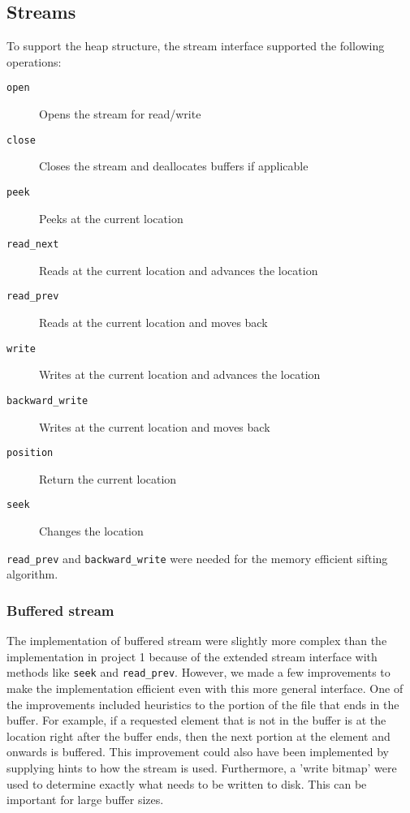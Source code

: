 \subsection{Streams}

To support the heap structure, the stream interface supported the following operations:

\begin{description}
\item[{\texttt{open}}] Opens the stream for read/write
\item[{\texttt{close}}] Closes the stream and deallocates buffers if applicable
\item[{\texttt{peek}}] Peeks at the current location
\item[{\texttt{read\_next}}] Reads at the current location and advances the location
\item[{\texttt{read\_prev}}] Reads at the current location and moves back
\item[{\texttt{write}}] Writes at the current location and advances the location
\item[{\texttt{backward\_write}}] Writes at the current location and moves back
\item[{\texttt{position}}] Return the current location
\item[{\texttt{seek}}] Changes the location
\end{description}

\texttt{read\_prev} and \texttt{backward\_write} were needed for the memory efficient sifting algorithm.

\subsubsection{Buffered stream}

The implementation of buffered stream were slightly more complex than the implementation in project 1 because of the extended stream interface with methods like \texttt{seek} and \texttt{read\_prev}. However, we made a few improvements to make the implementation efficient even with this more general interface. One of the improvements included heuristics to the portion of the file that ends in the buffer. For example, if a requested element that is not in the buffer is at the location right after the buffer ends, then the next portion at the element and onwards is buffered. This improvement could also have been implemented by supplying hints to how the stream is used. Furthermore, a 'write bitmap' were used to determine exactly what needs to be written to disk. This can be important for large buffer sizes.

